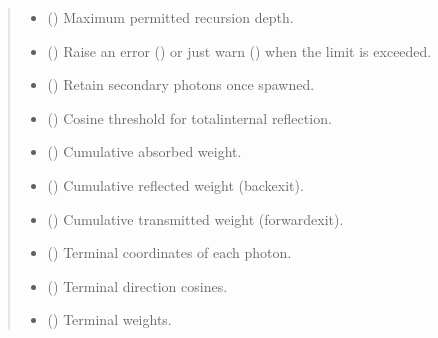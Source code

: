 \documentclass[letterpaper,10pt,english]{sphinxmanual}
\begin{document}
\begin{fulllineitems}
\begin{quote}
\begin{description}
\begin{itemize}
\item {} 
\sphinxAtStartPar
{} () \textendash{} Maximum permitted recursion depth.

\item {} 
\sphinxAtStartPar
{} () \textendash{} Raise an error () or just warn () when the limit is exceeded.

\item {} 
\sphinxAtStartPar
{} () \textendash{} Retain secondary photons once spawned.

\item {} 
\sphinxAtStartPar
{} () \textendash{} Cosine threshold for total\sphinxhyphen{}internal reflection.

\item {} 
\sphinxAtStartPar
{} () \textendash{} Cumulative absorbed weight.

\item {} 
\sphinxAtStartPar
{} () \textendash{} Cumulative reflected weight (back\sphinxhyphen{}exit).

\item {} 
\sphinxAtStartPar
{} () \textendash{} Cumulative transmitted weight (forward\sphinxhyphen{}exit).

\item {} 
\sphinxAtStartPar
{} () \textendash{} Terminal coordinates of each photon.

\item {} 
\sphinxAtStartPar
{} () \textendash{} Terminal direction cosines.

\item {} 
\sphinxAtStartPar
{} () \textendash{} Terminal weights.


\end{itemize}
\end{description}
\end{quote}
\end{fulllineitems}
\end{document}

